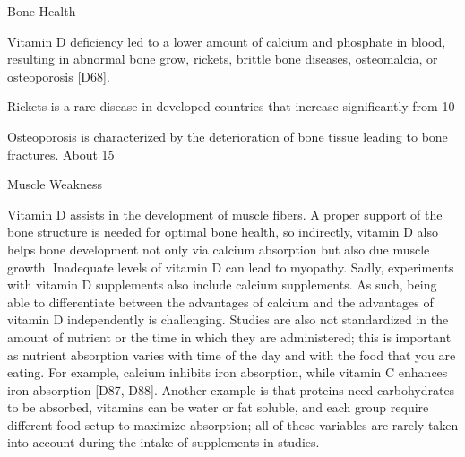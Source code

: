  

Bone Health 

 

Vitamin D deficiency led to a lower amount of calcium and phosphate in blood, resulting in abnormal bone grow, rickets, brittle bone diseases, osteomalcia, or osteoporosis [D68]. 

 

Rickets is a rare disease in developed countries that increase significantly from 10%

 

Osteoporosis is characterized by the deterioration of bone tissue leading to bone fractures. About 15%

 

Muscle Weakness 

 

Vitamin D assists in the development of muscle fibers. A proper support of the bone structure is needed for optimal bone health, so indirectly, vitamin D also helps bone development not only via calcium absorption but also due muscle growth. Inadequate levels of vitamin D can lead to myopathy. Sadly, experiments with vitamin D supplements also include calcium supplements. As such, being able to differentiate between the advantages of calcium and the advantages of vitamin D independently is challenging. Studies are also not standardized in the amount of nutrient or the time in which they are administered; this is important as nutrient absorption varies with time of the day and with the food that you are eating. For example, calcium inhibits iron absorption, while vitamin C enhances iron absorption [D87, D88]. Another example is that proteins need carbohydrates to be absorbed, vitamins can be water or fat soluble, and each group require different food setup to maximize absorption; all of these variables are rarely taken into account during the intake of supplements in studies. 

